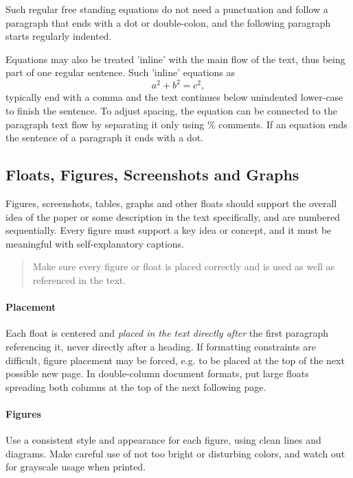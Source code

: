 \documentclass[11pt, a4paper,oneside,chapterprefix=false]{scrbook}
\begin{document}
Such regular free standing equations do not need a punctuation and follow a paragraph that ends with a dot or double-colon, and the following paragraph starts regularly indented.

Equations may also be treated 'inline' with the main flow of the text, thus being part of one regular sentence. Such 'inline' equations as
%
\begin{equation*}
a^2 + b^2 =  c^2,
\end{equation*}
%
typically end with a comma and the text continues below unindented lower-case to finish the sentence. To adjust spacing, the equation can be connected to the paragraph text flow by separating it only using \% comments. If an equation ends the sentence of a paragraph it ends with a dot.


\subsection*{Floats, Figures, Screenshots and Graphs}

Figures, screenshots, tables, graphs and other floats should support the overall idea of the paper or some description in the text specifically, and are numbered sequentially. Every figure must support a key idea or concept, and it must be meaningful with self-explanatory captions.

\begin{quotation}
Make sure every figure or float is placed correctly and is used as well as referenced in the text.
\end{quotation}

\paragraph{Placement}
Each float is centered and \emph{placed in the text directly after} the first paragraph referencing it, never directly after a heading. If formatting constraints are difficult, figure placement may be forced, e.g. to be placed at the top of the next possible new page.
In double-column document formats, put large floats spreading both columns at the top of the next following page.

\paragraph{Figures}
Use a consistent style and appearance for each figure, using clean lines and diagrams. Make careful use of not too bright or disturbing colors, and watch out for grayscale usage when printed.
\end{document}
